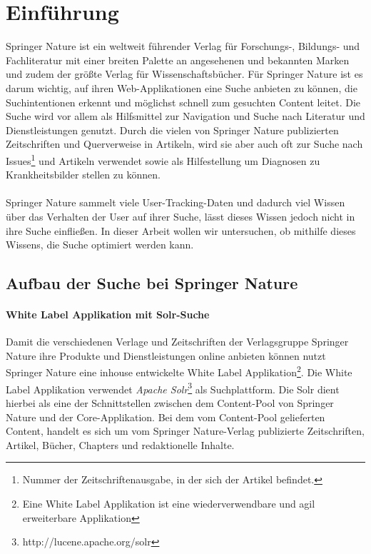 %
\chapter{Einführung}
\label{sec:Einfuehrung}

Springer Nature ist ein weltweit führender Verlag für Forschungs-, Bildungs- und Fachliteratur mit einer breiten Palette an angesehenen und bekannten Marken und zudem der größte Verlag für Wissenschaftsbücher. Für Springer Nature ist es darum wichtig, auf ihren Web-Applikationen eine Suche anbieten zu können, die Suchintentionen erkennt und möglichst schnell zum gesuchten Content leitet. Die Suche wird vor allem als Hilfsmittel zur Navigation und Suche nach Literatur und Dienstleistungen genutzt. Durch die vielen von Springer Nature publizierten Zeitschriften und Querverweise in Artikeln, wird sie aber auch oft zur Suche nach Issues\footnote{Nummer der Zeitschriftenausgabe, in der sich der Artikel befindet.} und Artikeln verwendet sowie als Hilfestellung um Diagnosen zu Krankheitsbilder stellen zu können.
\\
\\
Springer Nature sammelt viele User-Tracking-Daten und dadurch viel Wissen über das Verhalten der User auf ihrer Suche, lässt dieses Wissen jedoch nicht in ihre Suche einfließen. In dieser Arbeit wollen wir untersuchen, ob mithilfe dieses Wissens, die Suche optimiert werden kann.

\section{Aufbau der Suche bei Springer Nature}
\label{sec:Einfuehrung:AufbauSucheBeiSpringerNature}

\subsubsection{White Label Applikation mit Solr-Suche}
\label{sec:Einfuehrung:AufbauSucheBeiSpringerNature:WhiteLabelApplikationSolr-Suche}

Damit die verschiedenen Verlage und Zeitschriften der Verlagsgruppe Springer Nature ihre Produkte und Dienstleistungen online anbieten können nutzt Springer Nature eine inhouse entwickelte White Label Applikation\footnote{Eine White Label Applikation ist eine wiederverwendbare und agil erweiterbare Applikation}. Die White Label Applikation verwendet \textit{Apache Solr}\footnote{http://lucene.apache.org/solr} als Suchplattform. Die Solr dient hierbei als eine der Schnittstellen zwischen dem Content-Pool von Springer Nature und der Core-Applikation. Bei dem vom Content-Pool gelieferten Content, handelt es sich um vom Springer Nature-Verlag publizierte Zeitschriften, Artikel, Bücher, Chapters und redaktionelle Inhalte.

